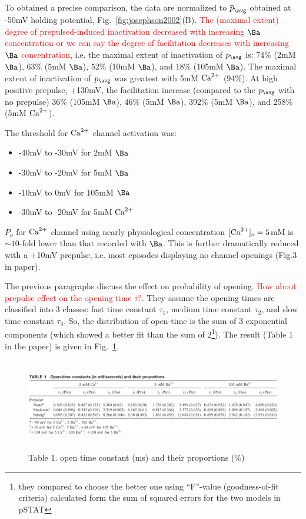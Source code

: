 To obtained a precise comparison, the data are normalized to
$\overline{p}_\avg$ obtained at -50mV holding potential,
Fig.~\ref{fig:josephson2002}(B).
\textcolor{red}{The (maximal extent) degree of prepulsed-induced
  inactivation decreased with increasing $\Ba$ concentration or we can
  say the degree of facilitation decreases with increasing $\Ba$
  concentration},
i.e. the maximal extent of inactivation of $p_\avg$ is: 74\% (2mM
$\Ba$), 63\% (5mM $\Ba$), 52\% (10mM $\Ba$), and 18\% (105mM
$\Ba$). The maximal extent of inactivation of $p_\avg$ was greatest
with 5mM ${\text{Ca}^{2+}}$ (94\%). At high positive prepulse, +130mV, the
facilitation increase (compared to the $p_\avg$ with no prepulse) 36\%
(105mM $\Ba$), 46\% (5mM $\Ba$), 392\% (5mM $\Ba$), and 258\% (5mM
${\text{Ca}^{2+}}$).

The threshold for ${\text{Ca}^{2+}}$ channel activation was:
\begin{itemize}
\item -40mV to -30mV for 2mM $\Ba$
\item -30mV to -20mV for 5mM $\Ba$
\item -10mV to 0mV for 105mM $\Ba$
\item -30mV to -20mV for 5mM ${\text{Ca}^{2+}}$
\end{itemize}
$P_o$ for ${\text{Ca}^{2+}}$ channel using nearly physiological concentration
$[{\text{Ca}^{2+}}]_o=5$mM is $\sim 10$-fold lower than that recorded with
$\Ba$. This is further dramatically reduced with a +10mV prepulse,
i.e. most episodes displaying no channel openings (Fig.3 in paper). 

The previous paragraphs discuss the effect on probability of opening.
\textcolor{red}{How about prepulse effect on the opening time
  $\tau$?}.
They assume the opening times are classified into 3 classes: fast time
constant $\tau_1$, medium time constant $\tau_2$, and slow time
constant $\tau_3$. So, the distribution of open-time is the sum of 3
exponential components (which showed a better fit than the sum of
2\footnote{they compared to choose the better one using ``F''-value
  (goodness-of-fit criteria) calculated form the sum of squared errors
  for the two models in pSTAT}).
The result (Table 1 in the paper) is given in
Fig.~\ref{fig:josephson2002-tau}.

\begin{figure}[hbt]
  \centerline{\includegraphics[height=4cm,
    angle=0]{./images/josephson_2002-tau.eps}}
  \caption{Table 1. open time constant (ms) and their proportions
    (\%)}
\label{fig:josephson2002-tau}
\end{figure}


